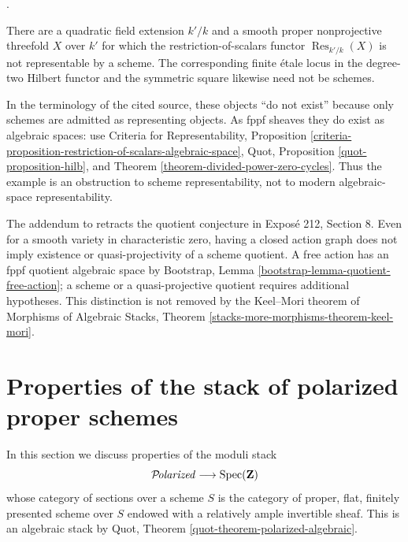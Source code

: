 \begin{remark}
\label{remark-Nagata-Weil-restriction-scheme}
\begin{reference}
\cite[Expos\'e 221, Section 7]{FGA}.
\end{reference}
There are a quadratic field extension $k'/k$ and a smooth proper
nonprojective threefold $X$ over $k'$ for which the restriction-of-scalars
functor $\operatorname{Res}_{k'/k}(X)$ is not representable by a scheme.
The corresponding finite \'etale locus in the degree-two Hilbert functor and
the symmetric square likewise need not be schemes.

In the terminology of the cited source, these objects ``do not exist''
because only schemes are admitted as representing objects. As fppf sheaves
they do exist as algebraic spaces: use Criteria for Representability,
Proposition
\ref{criteria-proposition-restriction-of-scalars-algebraic-space}, Quot,
Proposition \ref{quot-proposition-hilb}, and Theorem
\ref{theorem-divided-power-zero-cycles}. Thus the example is an obstruction
to scheme representability, not to modern algebraic-space representability.
\end{remark}

\begin{remark}
\label{remark-FGA-closed-graph-quotient}
The addendum to \cite[Expos\'e 221]{FGA} retracts the quotient conjecture in
Expos\'e 212, Section 8. Even for a smooth variety in characteristic zero,
having a closed action graph does not imply existence or quasi-projectivity
of a scheme quotient. A free action has an fppf quotient algebraic space by
Bootstrap, Lemma \ref{bootstrap-lemma-quotient-free-action}; a scheme or a
quasi-projective quotient requires additional hypotheses. This distinction
is not removed by the Keel--Mori theorem of Morphisms of Algebraic Stacks,
Theorem \ref{stacks-more-morphisms-theorem-keel-mori}.
\end{remark}





\section{Properties of the stack of polarized proper schemes}
\label{section-polarized}

\noindent
In this section we discuss properties of the moduli stack
$$
\mathcal{P}\!\mathit{olarized} \longrightarrow \mathop{\mathrm{Spec}}(\mathbf{Z})
$$
whose category of sections over a scheme $S$ is the category of
proper, flat, finitely presented scheme over $S$ endowed
with a relatively ample invertible sheaf. This is an algebraic
stack by Quot, Theorem \ref{quot-theorem-polarized-algebraic}.

